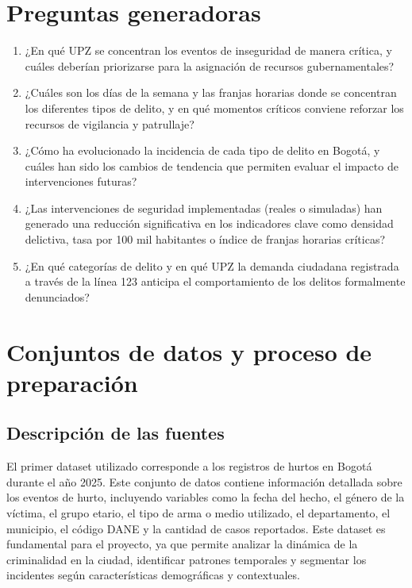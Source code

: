 \documentclass[12pt,letterpaper]{article}
\begin{document}
\section{Preguntas generadoras}

\begin{enumerate}
    \item ¿En qué UPZ se concentran los eventos de inseguridad de manera crítica, y cuáles deberían priorizarse para la asignación de recursos gubernamentales?
    \item ¿Cuáles son los días de la semana y las franjas horarias donde se concentran los diferentes tipos de delito, y en qué momentos críticos conviene reforzar los recursos de vigilancia y patrullaje?
    \item ¿Cómo ha evolucionado la incidencia de cada tipo de delito en Bogotá, y cuáles han sido los cambios de tendencia que permiten evaluar el impacto de intervenciones futuras?
    \item ¿Las intervenciones de seguridad implementadas (reales o simuladas) han generado una reducción significativa en los indicadores clave como densidad delictiva, tasa por 100 mil habitantes o índice de franjas horarias críticas?
    \item ¿En qué categorías de delito y en qué UPZ la demanda ciudadana registrada a través de la línea 123 anticipa el comportamiento de los delitos formalmente denunciados?
\end{enumerate}

\section{Conjuntos de datos y proceso de preparación}

\subsection{Descripción de las fuentes}

El primer dataset utilizado corresponde a los registros de hurtos en Bogotá durante el año 2025. Este conjunto de datos contiene información detallada sobre los eventos de hurto, incluyendo variables como la fecha del hecho, el género de la víctima, el grupo etario, el tipo de arma o medio utilizado, el departamento, el municipio, el código DANE y la cantidad de casos reportados. Este dataset es fundamental para el proyecto, ya que permite analizar la dinámica de la criminalidad en la ciudad, identificar patrones temporales y segmentar los incidentes según características demográficas y contextuales.
\end{document}
